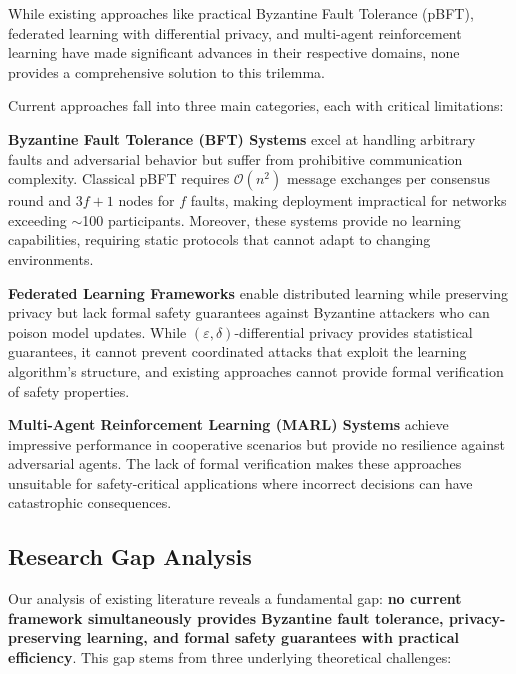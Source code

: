 \documentclass[conference]{IEEEtran}
\newcommand{\bigO}{\mathcal{O}}
\newcommand{\epsilon}{\varepsilon}
\begin{document}
While existing approaches like practical Byzantine Fault Tolerance (pBFT), federated learning with differential privacy, and multi-agent reinforcement learning have made significant advances in their respective domains, none provides a comprehensive solution to this trilemma.

Current approaches fall into three main categories, each with critical limitations:

\textbf{Byzantine Fault Tolerance (BFT) Systems} excel at handling arbitrary faults and adversarial behavior but suffer from prohibitive communication complexity. Classical pBFT requires $\bigO(n^2)$ message exchanges per consensus round and $3f+1$ nodes for $f$ faults, making deployment impractical for networks exceeding $\sim$100 participants. Moreover, these systems provide no learning capabilities, requiring static protocols that cannot adapt to changing environments.

\textbf{Federated Learning Frameworks} enable distributed learning while preserving privacy but lack formal safety guarantees against Byzantine attackers who can poison model updates. While $(\epsilon,\delta)$-differential privacy provides statistical guarantees, it cannot prevent coordinated attacks that exploit the learning algorithm's structure, and existing approaches cannot provide formal verification of safety properties.

\textbf{Multi-Agent Reinforcement Learning (MARL) Systems} achieve impressive performance in cooperative scenarios but provide no resilience against adversarial agents. The lack of formal verification makes these approaches unsuitable for safety-critical applications where incorrect decisions can have catastrophic consequences.

\subsection{Research Gap Analysis}

Our analysis of existing literature reveals a fundamental gap: \textbf{no current framework simultaneously provides Byzantine fault tolerance, privacy-preserving learning, and formal safety guarantees with practical efficiency}. This gap stems from three underlying theoretical challenges:
\end{document}
